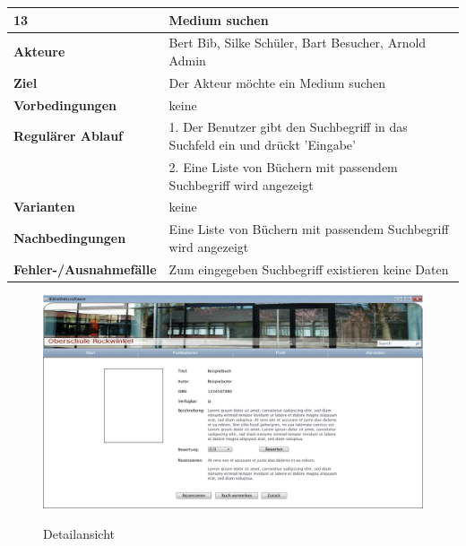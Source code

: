\documentclass[fontsize=12pt,paper=a4,twoside]{scrartcl}
\begin{document}
\begin{table}[htbp]
\label{13}
\begin{tabular}{|l|p{10cm}|}
\hline 
\textbf{13} & \textbf{Medium suchen} \\ \hline
\textbf{Akteure} & Bert Bib, Silke Schüler, Bart Besucher, Arnold Admin\\ \hline
\textbf{Ziel} & Der Akteur möchte ein Medium suchen \\ \hline
\textbf{Vorbedingungen} & keine \\ \hline
\textbf{Regulärer Ablauf} & 
1. Der Benutzer gibt den Suchbegriff in das Suchfeld ein und drückt 'Eingabe' \\
&2. Eine Liste von Büchern mit passendem Suchbegriff wird angezeigt\\
\hline
\textbf{Varianten} & 
keine \\ \hline
\textbf{Nachbedingungen} & Eine Liste von Büchern mit passendem Suchbegriff wird angezeigt\\ \hline
\textbf{Fehler-/Ausnahmefälle} & Zum eingegeben Suchbegriff existieren keine Daten\\
\hline
\end{tabular}
\end{table}

\begin{figure}[htbp]
\caption{Detailansicht}
\includegraphics[width=1\textwidth]{ScreensWebsite/DetailansichtBuchLoggedInSchueler.png}
  \label{Detailansicht}
\end{figure}
\end{document}
